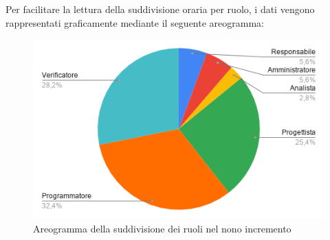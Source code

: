 \documentclass[../piano-di-progetto.tex]{subfiles}
\begin{document}
  Per facilitare la lettura della suddivisione oraria per ruolo, i dati vengono rappresentati graficamente mediante il seguente areogramma:
  \begin{figure}[H]
    \centering
    \includegraphics[width=12cm]{img/ruoli-9-incr.png}
    \caption{Areogramma della suddivisione dei ruoli nel nono incremento}
    \label{fig:ore-ruolo-progettazione}
  \end{figure}
\end{document}
